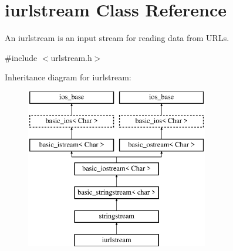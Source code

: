 \hypertarget{classiurlstream}{}\section{iurlstream Class Reference}
\label{classiurlstream}


An {\ttfamily iurlstream} is an input stream for reading data from U\+R\+Ls.  




{\ttfamily \#include $<$urlstream.\+h$>$}

Inheritance diagram for iurlstream\+:\begin{figure}[H]
\begin{center}
\leavevmode
\includegraphics[height=7.000000cm]{classiurlstream}
\end{center}
\end{figure}
